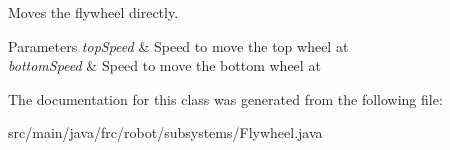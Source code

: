 Moves the flywheel directly. 


\begin{DoxyParams}{Parameters}
{\em top\+Speed} & Speed to move the top wheel at \\
\hline
{\em bottom\+Speed} & Speed to move the bottom wheel at \\
\hline
\end{DoxyParams}


The documentation for this class was generated from the following file\+:\begin{DoxyCompactItemize}
\item 
src/main/java/frc/robot/subsystems/Flywheel.\+java\end{DoxyCompactItemize}
